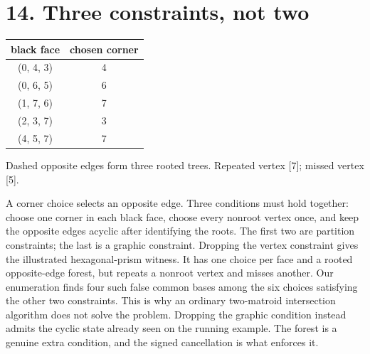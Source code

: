 \documentclass[10pt,a4paper]{amsart}
\begin{document}
\section*{14. Three constraints, not two}
\begin{center}\begin{minipage}{.86\textwidth}\centering
{}\par\medskip \begin{tabular}{cc}\hline
black face & chosen corner\\\hline
(0, 4, 3) & 4\\
(0, 6, 5) & 6\\
(1, 7, 6) & 7\\
(2, 3, 7) & 3\\
(4, 5, 7) & 7\\
\hline\end{tabular}\par Dashed opposite edges form three rooted trees. Repeated vertex [7]; missed vertex [5].
\end{minipage}\end{center}
A corner choice selects an opposite edge. Three conditions must hold together: choose one corner in each black face, choose every nonroot vertex once, and keep the opposite edges acyclic after identifying the roots. The first two are partition constraints; the last is a graphic constraint. Dropping the vertex constraint gives the illustrated hexagonal-prism witness. It has one choice per face and a rooted opposite-edge forest, but repeats a nonroot vertex and misses another. Our enumeration finds four such false common bases among the six choices satisfying the other two constraints. This is why an ordinary two-matroid intersection algorithm does not solve the problem. Dropping the graphic condition instead admits the cyclic state already seen on the running example. The forest is a genuine extra condition, and the signed cancellation is what enforces it.
\end{document}
